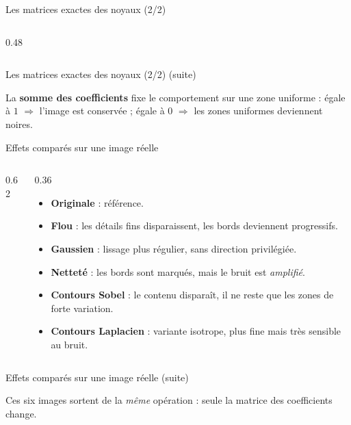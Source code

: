 \begin{frame}{Les matrices exactes des noyaux (2/2)}
\begin{columns}[t]
\begin{column}{0.48\textwidth}
\end{column}
\end{columns}
\end{frame}
\begin{frame}{Les matrices exactes des noyaux (2/2) (suite)}
\begin{wbox}
La \textbf{somme des coefficients} fixe le comportement sur une zone
uniforme : égale à $1$ $\Rightarrow$ l'image est conservée ; égale à $0$
$\Rightarrow$ les zones uniformes deviennent noires.
\end{wbox}
\end{frame}

\begin{frame}{Effets comparés sur une image réelle}
\begin{columns}[t]
\begin{column}{0.62\textwidth}
\begin{figbox}
\centering
\end{figbox}
\end{column}
\begin{column}{0.36\textwidth}
\begin{itemize}
  \item \textbf{Originale} : référence.
  \item \textbf{Flou} : les détails fins disparaissent, les bords deviennent
  progressifs.
  \item \textbf{Gaussien} : lissage plus régulier, sans direction privilégiée.
  \item \textbf{Netteté} : les bords sont marqués, mais le bruit est
  \emph{amplifié}.
  \item \textbf{Contours Sobel} : le contenu disparaît, il ne reste que les
  zones de forte variation.
  \item \textbf{Contours Laplacien} : variante isotrope, plus fine mais très
  sensible au bruit.
\end{itemize}

\end{column}
\end{columns}
\end{frame}
\begin{frame}{Effets comparés sur une image réelle (suite)}
\begin{kbox}[Lecture]
Ces six images sortent de la \emph{même} opération : seule la matrice des
coefficients change.
\end{kbox}
\end{frame}

